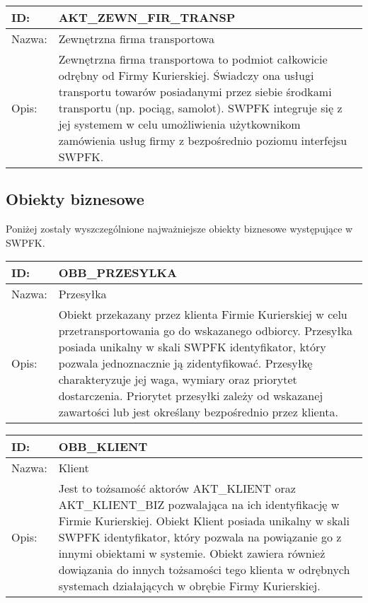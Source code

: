 \begin{center}
\begin{tabular}[h]{|p{1.6cm}|p{13.5cm}|}
\hline
ID: & AKT\_ZEWN\_FIR\_TRANSP \\ \hline
Nazwa: & Zewnętrzna firma transportowa \\ \hline
Opis: & Zewnętrzna firma transportowa to podmiot całkowicie odrębny od Firmy Kurierskiej. Świadczy ona usługi transportu towarów posiadanymi przez siebie środkami transportu (np. pociąg, samolot). SWPFK integruje się z jej systemem w celu umożliwienia użytkownikom zamówienia usług firmy z bezpośrednio poziomu interfejsu SWPFK. \\
\hline
\end{tabular}
\end{center}

\subsection{Obiekty biznesowe}
Poniżej zostały wyszczególnione najważniejsze obiekty biznesowe występujące w SWPFK.

\begin{center}
\begin{tabular}[h]{|p{1.6cm}|p{13.5cm}|}
\hline
ID: & OBB\_PRZESYLKA \\ \hline
Nazwa: & Przesyłka \\ \hline
Opis: & Obiekt przekazany przez klienta Firmie Kurierskiej w celu przetransportowania go do wskazanego odbiorcy. Przesyłka posiada unikalny w skali SWPFK identyfikator, który pozwala jednoznacznie ją zidentyfikować. Przesyłkę charakteryzuje jej waga, wymiary oraz priorytet dostarczenia. Priorytet przesyłki zależy od wskazanej zawartości lub jest określany bezpośrednio przez klienta. \\
\hline
\end{tabular}
\end{center}

\begin{center}
\begin{tabular}[h]{|p{1.6cm}|p{13.5cm}|}
\hline
ID: & OBB\_KLIENT \\ \hline
Nazwa: & Klient \\ \hline
Opis: & Jest to tożsamość aktorów AKT\_KLIENT oraz AKT\_KLIENT\_BIZ pozwalająca na ich identyfikację w Firmie Kurierskiej. Obiekt Klient posiada unikalny w skali SWPFK identyfikator, który pozwala na powiązanie go z innymi obiektami w systemie. Obiekt zawiera również dowiązania do innych tożsamości tego klienta w odrębnych systemach działających w obrębie Firmy Kurierskiej. \\
\hline
\end{tabular}
\end{center}

